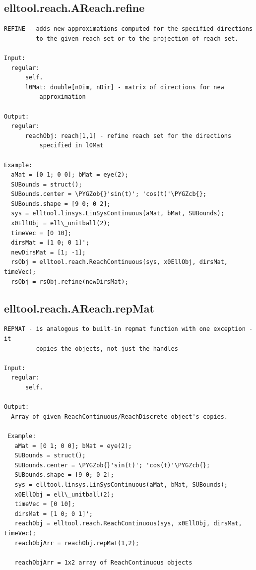 \documentclass[letterpaper,10pt,english]{sphinxmanual}
\def\PYGZob{\char`\{}
\def\PYGZcb{\char`\}}
\begin{document}
\subsection{elltool.reach.AReach.refine}
\label{chap_functions:elltool-reach-areach-refine}
\begin{Verbatim}[commandchars=\\\{\}]
REFINE - adds new approximations computed for the specified directions
         to the given reach set or to the projection of reach set.

Input:
  regular:
      self.
      l0Mat: double[nDim, nDir] - matrix of directions for new
          approximation

Output:
  regular:
      reachObj: reach[1,1] - refine reach set for the directions
          specified in l0Mat

Example:
  aMat = [0 1; 0 0]; bMat = eye(2);
  SUBounds = struct();
  SUBounds.center = \PYGZob{}'sin(t)'; 'cos(t)'\PYGZcb{};
  SUBounds.shape = [9 0; 0 2];
  sys = elltool.linsys.LinSysContinuous(aMat, bMat, SUBounds);
  x0EllObj = ell\_unitball(2);
  timeVec = [0 10];
  dirsMat = [1 0; 0 1]';
  newDirsMat = [1; -1];
  rsObj = elltool.reach.ReachContinuous(sys, x0EllObj, dirsMat, timeVec);
  rsObj = rsObj.refine(newDirsMat);
\end{Verbatim}


\subsection{elltool.reach.AReach.repMat}
\label{chap_functions:elltool-reach-areach-repmat}
\begin{Verbatim}[commandchars=\\\{\}]
REPMAT - is analogous to built-in repmat function with one exception - it
         copies the objects, not just the handles

Input:
  regular:
      self.

Output:
  Array of given ReachContinuous/ReachDiscrete object's copies.

 Example:
   aMat = [0 1; 0 0]; bMat = eye(2);
   SUBounds = struct();
   SUBounds.center = \PYGZob{}'sin(t)'; 'cos(t)'\PYGZcb{};
   SUBounds.shape = [9 0; 0 2];
   sys = elltool.linsys.LinSysContinuous(aMat, bMat, SUBounds);
   x0EllObj = ell\_unitball(2);
   timeVec = [0 10];
   dirsMat = [1 0; 0 1]';
   reachObj = elltool.reach.ReachContinuous(sys, x0EllObj, dirsMat, timeVec);
   reachObjArr = reachObj.repMat(1,2);

   reachObjArr = 1x2 array of ReachContinuous objects
\end{Verbatim}
\end{document}
